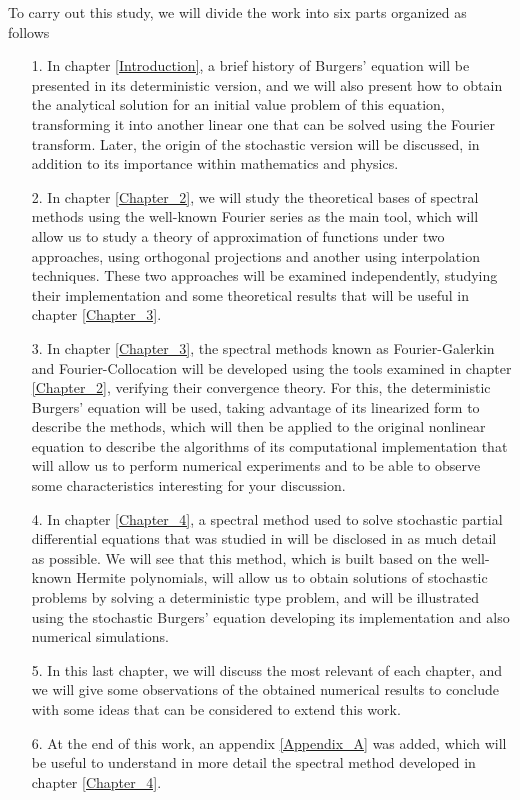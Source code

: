 	To carry out this study, we will divide the work into six parts organized as follows
	\begin{enumerate}
		\item[1.] In chapter \ref{Introduction}, a brief history of Burgers' equation will be presented in its deterministic version, and we will also present how to obtain the analytical solution for an initial value problem of this equation, transforming it into another linear one that can be solved using the Fourier transform. Later, the origin of the stochastic version will be discussed, in addition to its importance within mathematics and physics.
		
		\item[2.] In chapter \ref{Chapter_2}, we will study the theoretical bases of spectral methods using the well-known Fourier series as the main tool, which will allow us to study a theory of approximation of functions under two approaches, using orthogonal projections and another using interpolation techniques. These two approaches will be examined independently, studying their implementation and some theoretical results that will be useful in chapter \ref{Chapter_3}.  
		
		\item[3.] In chapter \ref{Chapter_3}, the spectral methods known as Fourier-Galerkin and Fourier-Collocation will be developed using the tools examined in chapter \ref{Chapter_2}, verifying their convergence theory. For this, the deterministic Burgers' equation will be used, taking advantage of its linearized form to describe the methods, which will then be applied to the original nonlinear equation to describe the algorithms of its computational implementation that will allow us to perform numerical experiments and to be able to observe some characteristics interesting for your discussion.
		
		\item[4.] In chapter \ref{Chapter_4}, a spectral method used to solve stochastic partial differential equations that was studied in \cite{Delgado2016} will be disclosed in as much detail as possible. We will see that this method, which is built based on the well-known Hermite polynomials, will allow us to obtain solutions of stochastic problems by solving a deterministic type problem, and will be illustrated using the stochastic Burgers' equation developing its implementation and also numerical simulations.
		
		\item[5.] In this last chapter, we will discuss the most relevant of each chapter, and we will give some observations of the obtained numerical results to conclude with some ideas that can be considered to extend this work.
		
		\item[6.] At the end of this work, an appendix \ref{Appendix_A} was added, which will be useful to understand in more detail the spectral method developed in chapter \ref{Chapter_4}.
	\end{enumerate}
	
	
	\newpage
	
